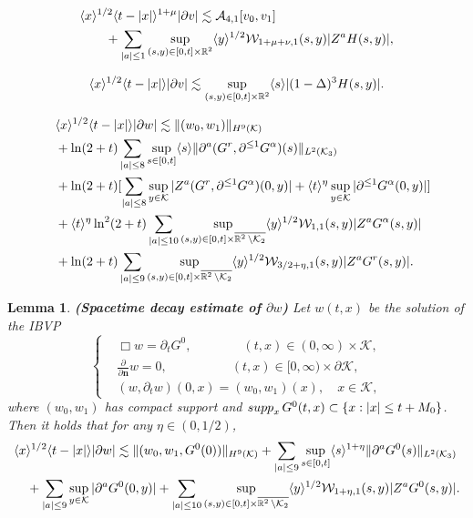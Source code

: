 \documentclass[10pt,a4paper]{amsart}
\newtheorem{lemma}{Lemma}
\def\R{\mathop{\mathbb R\kern 0pt}\nolimits}
\def\bn{\mathbf{n}}
\def\cA{\mathcal A}
\def\cK{\mathcal K}
\def\cW{\mathcal W}
\def\ls{\lesssim}
\def\p{\partial}
\def\supp{\mathop{\rm supp}\nolimits}
\newcommand{\w}[1]{\langle {#1} \rangle}
\begin{document}
\begin{equation}\label{dpw:ivp}
\begin{split}
&\w{x}^{1/2}\w{t-|x|}^{1+\mu}|\p v|\ls\cA_{4,1}[v_0,v_1]\\
&\qquad+\sum_{|a|\le1}\sup_{(s,y)\in[0,t]\times\R^2}\w{y}^{1/2}\cW_{1+\mu+\nu,1}(s,y)|Z^aH(s,y)|,
\end{split}
\end{equation}

\begin{equation}\label{dpw:compact}
\w{x}^{1/2}\w{t-|x|}|\p v|
\ls\sup_{(s,y)\in[0,t]\times\R^2}\w{s}|(1-\Delta)^3H(s,y)|.
\end{equation}

\begin{equation}\label{dpw:ibvp}
\begin{split}
&\quad\w{x}^{1/2}\w{t-|x|}|\p w|\ls\|(w_0,w_1)\|_{H^9(\cK)}\\
&\quad+\ln(2+t)\sum_{|a|\le8}\sup_{s\in[0,t]}\w{s}\|\p^a(G^r,\p^{\le1}G^\alpha)(s)\|_{L^2(\cK_3)}\\
&\quad+\ln(2+t)[\sum_{|a|\le8}\sup_{y\in\cK}|Z^a(G^r,\p^{\le1}G^\alpha)(0,y)|+\w{t}^\eta\sup_{y\in\cK}|\p^{\le1}G^\alpha(0,y)|]\\
&\quad+\w{t}^\eta\ln^2(2+t)\sum_{|a|\le10}\sup_{(s,y)\in[0,t]\times\overline{\R^2\setminus\cK_2}}\w{y}^{1/2}\cW_{1,1}(s,y)|Z^aG^\alpha(s,y)|\\
&\quad+\ln(2+t)\sum_{|a|\le9}\sup_{(s,y)\in[0,t]\times\overline{\R^2\setminus\cK_2}}\w{y}^{1/2}\cW_{3/2+\eta,1}(s,y)|Z^aG^r(s,y)|.
\end{split}
\end{equation}

\begin{lemma}
{\bf (Spacetime decay estimate of $\p w$)}
Let $w(t,x)$ be the solution of the IBVP
\begin{equation*}
\left\{
\begin{aligned}
&\Box w=\p_tG^0,\qquad \qquad(t,x)\in(0,\infty)\times\cK,\\
&\frac{\p}{\p\bn}w=0,\qquad\qquad\quad (t,x)\in[0,\infty)\times\p\cK,\\
&(w,\p_tw)(0,x)=(w_0,w_1)(x),\quad x\in\cK,
\end{aligned}
\right.
\end{equation*}
where $(w_0,w_1)$ has compact support and $\supp_x G^0(t,x)\subset\{x: |x|\le t+M_0\}$.
Then it holds that for any $\eta\in(0,1/2)$,
\begin{equation}\label{dtpw:ibvp}
\begin{split}
&\w{x}^{1/2}\w{t-|x|}|\p w|\ls\|(w_0,w_1,G^0(0))\|_{H^9(\cK)}+\sum_{|a|\le9}\sup_{s\in[0,t]}\w{s}^{1+\eta}\|\p^aG^0(s)\|_{L^2(\cK_3)}\\
&\quad+\sum_{|a|\le9}\sup_{y\in\cK}|\p^aG^0(0,y)|
+\sum_{|a|\le10}\sup_{(s,y)\in[0,t]\times\overline{\R^2\setminus\cK_2}}\w{y}^{1/2}\cW_{1+\eta,1}(s,y)|Z^aG^0(s,y)|.
\end{split}
\end{equation}
\end{lemma}
\end{document}
